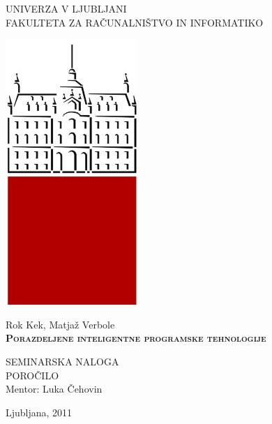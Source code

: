 \documentclass[12pt,a4paper,openany]{book}
\begin{document}
\thispagestyle{empty} 

\begin{center}
{\large 
UNIVERZA V LJUBLJANI\\
FAKULTETA ZA RAČUNALNIŠTVO IN INFORMATIKO\\
}

 \includegraphics[scale=0.2,keepaspectratio=true]{./pictures/uni_logo.png}


\vspace{1.5cm}
{\LARGE Rok Kek, Matjaž Verbole}\\

\vspace{2cm}
\textsc{\textbf{\LARGE 
Porazdeljene inteligentne programske tehnologije
}}

\vspace{2cm}
{ SEMINARSKA NALOGA}\\
{ POROČILO }\\

\vspace{2cm} 
{\Large Mentor: Luka Čehovin}

\vfill
{\Large Ljubljana, 2011}
\end{center}

\newpage


\renewcommand\thepage{} 
\tableofcontents 
\renewcommand\thepage{\arabic{page}}

\thispagestyle{empty}




\setcounter{page}{1}
\end{document}

